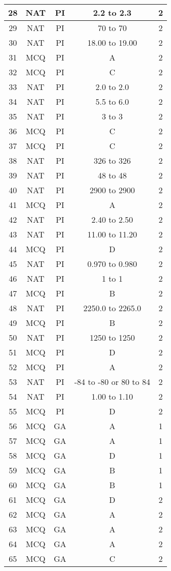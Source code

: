 \begin{table}
\begin{center}
\begin{tabular}{|c|c|c|c|c|}
28 & NAT & PI & 2.2 to 2.3       & 2 \\ \hline
29 & NAT & PI & 70 to 70         & 2 \\ \hline
30 & NAT & PI & 18.00 to 19.00   & 2 \\ \hline
31 & MCQ & PI & A                & 2 \\ \hline
32 & MCQ & PI & C                & 2 \\ \hline
33 & NAT & PI & 2.0 to 2.0       & 2 \\ \hline
34 & NAT & PI & 5.5 to 6.0       & 2 \\ \hline
35 & NAT & PI & 3 to 3           & 2 \\ \hline
36 & MCQ & PI & C                & 2 \\ \hline
37 & MCQ & PI & C & 2 \\ \hline
38 & NAT & PI & 326 to 326 & 2 \\ \hline
39 & NAT & PI & 48 to 48 & 2 \\ \hline
40 & NAT & PI & 2900 to 2900 & 2 \\ \hline
41 & MCQ & PI & A & 2 \\ \hline
42 & NAT & PI & 2.40 to 2.50 & 2 \\ \hline
43 & NAT & PI & 11.00 to 11.20 & 2 \\ \hline
44 & MCQ & PI & D & 2 \\ \hline
45 & NAT & PI & 0.970 to 0.980 & 2 \\ \hline
46 & NAT & PI & 1 to 1 & 2 \\ \hline
47 & MCQ & PI & B & 2 \\ \hline
48 & NAT & PI & 2250.0 to 2265.0 & 2 \\ \hline
49 & MCQ & PI & B & 2 \\ \hline
50 & NAT & PI & 1250 to 1250 & 2 \\ \hline
51 & MCQ & PI & D & 2 \\ \hline
52 & MCQ & PI & A & 2 \\ \hline
53 & NAT & PI & -84 to -80 or 80 to 84 & 2 \\ \hline
54 & NAT & PI & 1.00 to 1.10 & 2 \\ \hline
55 & MCQ & PI & D & 2 \\ \hline
56 & MCQ & GA & A & 1 \\ \hline
57 & MCQ & GA & A & 1 \\ \hline
58 & MCQ & GA & D & 1 \\ \hline
59 & MCQ & GA & B & 1 \\ \hline
60 & MCQ & GA & B & 1 \\ \hline
61 & MCQ & GA & D & 2 \\ \hline
62 & MCQ & GA & A & 2 \\ \hline
63 & MCQ & GA & A & 2 \\ \hline
64 & MCQ & GA & A & 2 \\ \hline
65 & MCQ & GA & C & 2 \\ \hline
\end{tabular}
\end{center}

\end{table}
